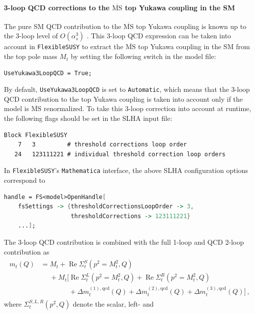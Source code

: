 \documentclass[final,3p,11pt,pdflatex]{elsarticle}
\makeatletter
\newcommand{\fs}{\texttt{FlexibleSUSY}\@\xspace}
\newcommand{\mathematica}{\texttt{Ma\-the\-ma\-ti\-ca}\xspace}
\newcommand{\code}[1]{\lstinline|#1|}  %
\newcommand{\ol}[1]{\overline{#1}}
\newcommand{\MSbar}{\ensuremath{\ol{\text{MS}}}\xspace}
\DeclareMathOperator{\re}{Re}
\def\as{\alpha_s}
\makeatother
\begin{document}
\paragraph{3-loop QCD corrections to the \MSbar top Yukawa coupling in the SM}

The pure SM QCD contribution to the \MSbar top Yukawa
coupling is known up to the 3-loop level of $O(\as^3)$
\cite{Chetyrkin:1999qi,Melnikov:2000qh}.  This 3-loop QCD expression
can be taken into account in \fs to extract the \MSbar top Yukawa
coupling in the SM from the top pole mass $M_t$ by setting
the following switch in the model file:
%
\begin{lstlisting}
UseYukawa3LoopQCD = True;
\end{lstlisting}
%
By default, \code{UseYukawa3LoopQCD} is set to \code{Automatic}, which
means that the 3-loop QCD contribution to the top Yukawa coupling is
taken into account only if the model is \MSbar renormalized.  To take
this 3-loop correction into account at runtime, the following flags
should be set in the SLHA input file:
%
\\\begin{minipage}{\linewidth}
\begin{lstlisting}
Block FlexibleSUSY
    7   3         # threshold corrections loop order
   24   123111221 # individual threshold correction loop orders
\end{lstlisting}
\end{minipage}
%
In \fs's \mathematica interface, the above SLHA configuration options
correspond to
%
\begin{lstlisting}[language=Mathematica]
handle = FS<model>OpenHandle[
    fsSettings -> {thresholdCorrectionsLoopOrder -> 3,
                   thresholdCorrections -> 123111221}
    ...];
\end{lstlisting}
%
The 3-loop QCD contribution is combined with the full 1-loop and QCD
2-loop contribution as
%
\begin{align}
\begin{split}
  m_t(Q) &= M_t + \re\Sigma_{t}^S(p^2=M_t^2,Q) \\
  &\phantom{={}} + M_t \Big[ \re\Sigma_{t}^L(p^2=M_t^2,Q) +
    \re\Sigma_{t}^R(p^2=M_t^2,Q) \\
  &\phantom{={} + M_t \Big[}
    + \Delta m_t^{(1),\text{qcd}}(Q) + \Delta m_t^{(2),\text{qcd}}(Q) + \Delta m_t^{(3),\text{qcd}}(Q) \Big]
  \,,
\end{split} \label{eq:mt_MSbar}
\end{align}
%
where $\Sigma_t^{S,L,R}(p^2,Q)$ denote the scalar, left- and
\end{document}
